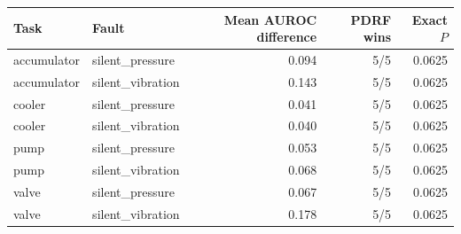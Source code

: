\begin{tabular}{llrrr}
\toprule
Task & Fault & Mean AUROC difference & PDRF wins & Exact $P$\\
\midrule
accumulator & silent\_pressure & 0.094 & 5/5 & 0.0625\\
accumulator & silent\_vibration & 0.143 & 5/5 & 0.0625\\
cooler & silent\_pressure & 0.041 & 5/5 & 0.0625\\
cooler & silent\_vibration & 0.040 & 5/5 & 0.0625\\
pump & silent\_pressure & 0.053 & 5/5 & 0.0625\\
pump & silent\_vibration & 0.068 & 5/5 & 0.0625\\
valve & silent\_pressure & 0.067 & 5/5 & 0.0625\\
valve & silent\_vibration & 0.178 & 5/5 & 0.0625\\
\bottomrule
\end{tabular}
